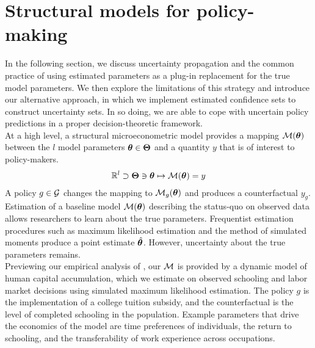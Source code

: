 \FloatBarrier\section{Structural models for policy-making}\label{Framework}
In the following section, we discuss uncertainty propagation and the common practice of using estimated parameters as a plug-in replacement for the true model parameters. We then explore the limitations of this strategy and introduce our alternative approach, in which we implement estimated confidence sets to construct uncertainty sets. In so doing, we are able to cope with uncertain policy predictions in a proper decision-theoretic framework. \\

\noindent At a high level, a structural microeconometric model provides a mapping $\mathcal{M}(\bm{\theta})$ between the $l$ model parameters $\bm{\theta} \in \bm{\Theta}$ and a quantity $y$ that is of interest to policy-makers.
%
\begin{align*}
  \mathbb{R}^l \supset \bm{\Theta} \ni \bm{\theta} \mapsto  \mathcal{M}(\bm{\theta}) = y
\end{align*}
%
\noindent A policy $g \in \mathcal{G}$ changes the mapping to $\mathcal{M}_g(\bm{\theta})$ and produces a counterfactual $y_g$.\\

\noindent Estimation of a baseline model $\mathcal{M}(\bm{\theta})$ describing the status-quo on observed data allows researchers to learn about the true parameters. Frequentist estimation procedures such as maximum likelihood estimation and the method of simulated moments produce a point estimate $\hat{\bm{\theta}}$. However, uncertainty about the true parameters remains.\\

\noindent Previewing our empirical analysis of \citet{Keane.1997}, our $\mathcal{M}$ is provided by a dynamic model of human capital accumulation, which we estimate on observed schooling and labor market decisions using simulated maximum likelihood estimation. The policy $g$ is the implementation of a college tuition subsidy, and the counterfactual is the level of completed schooling in the population. Example parameters that drive the economics of the model are time preferences of individuals, the return to schooling, and the transferability of work experience across occupations.\\

